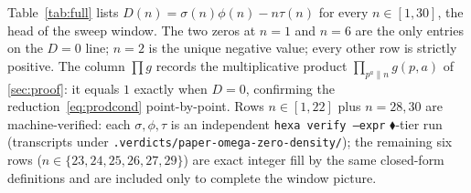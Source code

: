 \documentclass[11pt,a4paper]{article}
\newcommand{\sig}{\sigma}
\newcommand{\formal}{\textcolor{blue!60!black}{$\blacklozenge$}}
\theoremstyle{plain}
\theoremstyle{definition}
\begin{document}
Table~\ref{tab:full} lists $D(n)=\sig(n)\phi(n)-n\tau(n)$ for every
$n\in[1,30]$, the head of the sweep window. The two zeros at $n=1$ and $n=6$
are the only entries on the $D=0$ line; $n=2$ is the unique negative value;
every other row is strictly positive. The column $\prod g$ records the
multiplicative product $\prod_{p^a\|n} g(p,a)$ of \textsection\ref{sec:proof}:
it equals $1$ exactly when $D=0$, confirming the reduction~\eqref{eq:prodcond}
point-by-point. Rows $n\in[1,22]$ plus $n=28,30$ are machine-verified: each
$\sig,\phi,\tau$ is an independent \texttt{hexa verify --expr} \formal-tier run
(transcripts under \texttt{.verdicts/paper-omega-zero-density/}); the remaining
six rows ($n\in\{23,24,25,26,27,29\}$) are exact integer fill by the same
closed-form definitions and are included only to complete the window picture.
\end{document}
